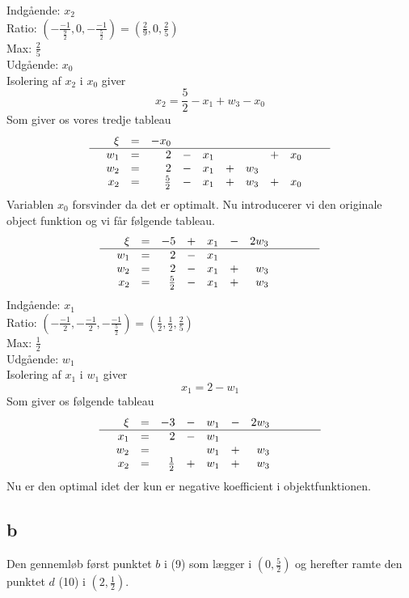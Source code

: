 \documentclass[12pt]{article}
\begin{document}
Indgående: $x_2$ \\
Ratio: $(-\frac{-1}{\frac{9}{2}},0,-\frac{-1}{\frac{5}{2}})=(\frac{2}{9},0,\frac{2}{5})$ \\
Max: $\frac{2}{5}$ \\
Udgående: $x_0$ \\
Isolering af $x_2$ i $x_0$ giver
$$x_2=\frac{5}{2}-x_1+w_3-x_0$$
Som giver os vores tredje tableau
\begin{equation}
\begin{array}{rrrrrrrrrrrl}
&\xi &= &-x_0&&&&&\\
\hline
&w_1 &= &2&-&x_1&&&+&x_0&&\\
&w_2&=&2&-&x_1&+&w_3&&&& \\
&x_2&=&\frac{5}{2}&-&x_1&+&w_3&+&x_0&&
\end{array}
\end{equation}
Variablen $x_0$ forsvinder da det er optimalt. Nu introducerer vi den originale object funktion og vi får følgende tableau.
\begin{equation}
\begin{array}{rrrrrrrrrrrl}
&\xi &= &-5&+&x_1&-&2w_3&&&\\
\hline
&w_1 &= &2&-&x_1&&&&&&\\
&w_2&=&2&-&x_1&+&w_3&&&& \\
&x_2&=&\frac{5}{2}&-&x_1&+&w_3&&&&
\end{array}
\end{equation}
Indgående: $x_1$ \\
Ratio: $(-\frac{-1}{2},-\frac{-1}{2},-\frac{-1}{\frac{5}{2}})=(\frac{1}{2},\frac{1}{2},\frac{2}{5})$ \\
Max: $\frac{1}{2}$ \\
Udgående: $w_1$ \\
Isolering af $x_1$ i $w_1$ giver
$$x_1=2-w_1$$
Som giver os følgende tableau
\begin{equation}
\begin{array}{rrrrrrrrrrrl}
&\xi &= &-3&-&w_1&-&2w_3&&&\\
\hline
&x_1 &= &2&-&w_1&&&&&&\\
&w_2&=&&&w_1&+&w_3&&&& \\
&x_2&=&\frac{1}{2}&+&w_1&+&w_3&&&&
\end{array}
\end{equation}
Nu er den optimal idet der kun er negative koefficient i objektfunktionen.


\subsection*{b}
Den gennemløb først punktet $b$ i (9) som lægger i $(0,\frac{5}{2})$ og herefter ramte den punktet $d$ (10) i $(2,\frac{1}{2})$.
\end{document}
